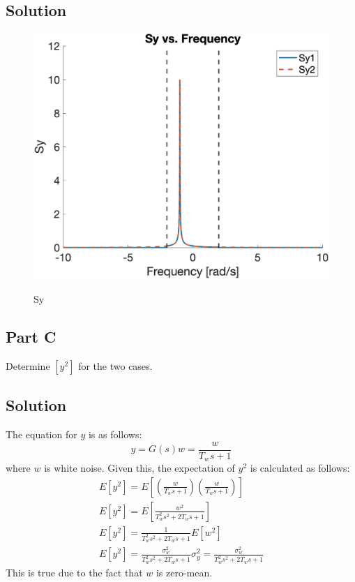 \documentclass{article}
\begin{document}
\subsection*{Solution}
\begin{figure}[H]
    \centering
    \includegraphics[width=0.75\linewidth]{../figures/p5_sy.png}\label{fig:p5_sy}
    \caption{Sy}
\end{figure}

\subsection*{Part C}
Determine $\left[y^2\right]$ for the two cases.
\subsection*{Solution}
The equation for $y$ is as follows:
\begin{equation}
    y = G(s)w = \frac{w}{T_w s+1}
\end{equation}
where $w$ is white noise.  Given this, the expectation of $y^2$ is calculated as follows:
\begin{gather*}
    E\left[y^2\right] = E\left[(\frac{w}{T_w s+1})(\frac{w}{T_w s+1})\right] \\
    E\left[y^2\right] = E\left[\frac{w^2}{T_w^2 s^2 + 2T_w s + 1}\right] \\
    E\left[y^2\right] = \frac{1}{T_w^2 s^2 + 2T_w s + 1}E\left[w^2\right] \\
    E\left[y^2\right] = \frac{\sigma_w^2}{T_w^2 s^2 + 2T_w s + 1}
    \sigma_y^2 = \frac{\sigma_w^2}{T_w^2 s^2 + 2T_w s + 1}
\end{gather*}
This is true due to the fact that $w$ is zero-mean.
\end{document}
